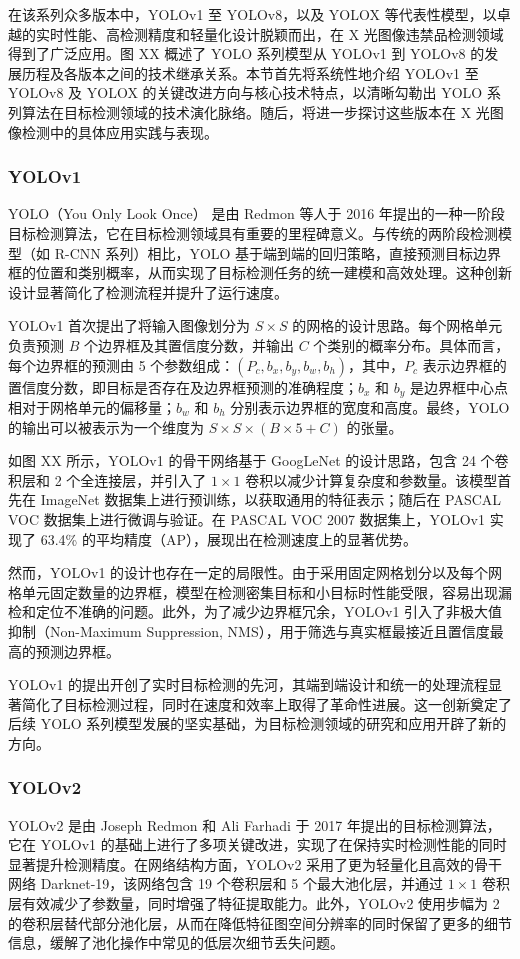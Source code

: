 \documentclass[11pt,twocolumn]{ctexart}
\begin{document}
在该系列众多版本中，YOLOv1 至 YOLOv8，以及 YOLOX 等代表性模型，以卓越的实时性能、高检测精度和轻量化设计脱颖而出，在 X 光图像违禁品检测领域得到了广泛应用。图 XX 概述了 YOLO 系列模型从 YOLOv1 到 YOLOv8 的发展历程及各版本之间的技术继承关系。本节首先将系统性地介绍 YOLOv1 至 YOLOv8 及 YOLOX 的关键改进方向与核心技术特点，以清晰勾勒出 YOLO 系列算法在目标检测领域的技术演化脉络。随后，将进一步探讨这些版本在 X 光图像检测中的具体应用实践与表现。
\subsubsection{YOLOv1}
YOLO（You Only Look Once） 是由 Redmon 等人于 2016 年提出的一种一阶段目标检测算法，它在目标检测领域具有重要的里程碑意义。与传统的两阶段检测模型（如 R-CNN 系列）相比，YOLO 基于端到端的回归策略，直接预测目标边界框的位置和类别概率，从而实现了目标检测任务的统一建模和高效处理。这种创新设计显著简化了检测流程并提升了运行速度。

YOLOv1 首次提出了将输入图像划分为 $S \times S$ 的网格的设计思路。每个网格单元负责预测 $B$ 个边界框及其置信度分数，并输出 $C$ 个类别的概率分布。具体而言，每个边界框的预测由 5 个参数组成：$(P_c, b_x, b_y, b_w, b_h)$，其中，$P_c$ 表示边界框的置信度分数，即目标是否存在及边界框预测的准确程度；$b_x$ 和 $b_y$ 是边界框中心点相对于网格单元的偏移量；$b_w$ 和 $b_h$ 分别表示边界框的宽度和高度。最终，YOLO 的输出可以被表示为一个维度为 $S \times S \times (B \times 5 + C)$ 的张量。

如图 XX 所示，YOLOv1 的骨干网络基于 GoogLeNet 的设计思路，包含 24 个卷积层和 2 个全连接层，并引入了 $1 \times 1$ 卷积以减少计算复杂度和参数量。该模型首先在 ImageNet 数据集上进行预训练，以获取通用的特征表示；随后在 PASCAL VOC 数据集上进行微调与验证。在 PASCAL VOC 2007 数据集上，YOLOv1 实现了 63.4\% 的平均精度（AP），展现出在检测速度上的显著优势。

然而，YOLOv1 的设计也存在一定的局限性。由于采用固定网格划分以及每个网格单元固定数量的边界框，模型在检测密集目标和小目标时性能受限，容易出现漏检和定位不准确的问题。此外，为了减少边界框冗余，YOLOv1 引入了非极大值抑制（Non-Maximum Suppression, NMS），用于筛选与真实框最接近且置信度最高的预测边界框。

YOLOv1 的提出开创了实时目标检测的先河，其端到端设计和统一的处理流程显著简化了目标检测过程，同时在速度和效率上取得了革命性进展。这一创新奠定了后续 YOLO 系列模型发展的坚实基础，为目标检测领域的研究和应用开辟了新的方向。
\subsubsection{YOLOv2}
YOLOv2 是由 Joseph Redmon 和 Ali Farhadi 于 2017 年提出的目标检测算法，它在 YOLOv1 的基础上进行了多项关键改进，实现了在保持实时检测性能的同时显著提升检测精度。在网络结构方面，YOLOv2 采用了更为轻量化且高效的骨干网络 Darknet-19，该网络包含 19 个卷积层和 5 个最大池化层，并通过 $1 \times 1$ 卷积层有效减少了参数量，同时增强了特征提取能力。此外，YOLOv2 使用步幅为 2 的卷积层替代部分池化层，从而在降低特征图空间分辨率的同时保留了更多的细节信息，缓解了池化操作中常见的低层次细节丢失问题。
\end{document}
